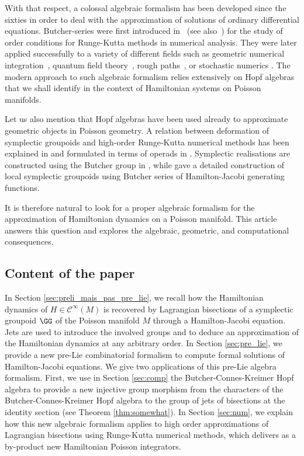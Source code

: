 \documentclass[a4paper,11pt]{article}
\newcommand{\func}[1]{\mathcal{C}^{\infty}(#1)}
\begin{document}
With that respect, a colossal algebraic formalism has been developed since the sixties in order to deal with the approximation of solutions of ordinary differential equations.
Butcher-series were first introduced in~\cite{Butcher72aat,Hairer74otb} (see also~\cite{Hairer06gni,McLachlan17bsa,Butcher21bsa}) for the study of order conditions for Runge-Kutta methods in numerical analysis.
They were later applied successfully to a variety of different fields such as geometric numerical integration~\cite{Iserles00lgm, Hairer06gni}, quantum field theory~\cite{Connes98har}, rough paths~\cite{Gubinelli10ror, Hairer15gvn}, or stochastic numerics \cite{Burrage96hso, Laurent20eab, Laurent21ocf, Busnot25osr}.
The modern approach to such algebraic formalism relies extensively on Hopf algebras \cite{Chartier10aso, Lundervold11hao, Bronasco22cef, Bronasco25hoi} that we shall identify in the context of Hamiltonian systems on Poisson manifolds.

Let us also mention that Hopf algebras have been used already to approximate geometric objects in Poisson geometry. A relation between deformation of symplectic groupoids and high-order Runge-Kutta numerical methods has been explained in \cite{Cattaneo2005} and formulated in terms of operads in \cite{Cattaneo2010}. Symplectic realisations are constructed using the Butcher group in \cite{dherin2016}, while \cite{cabrera2020} gave a detailed construction of local symplectic groupoids using Butcher series of Hamilton-Jacobi generating functions.

It is therefore natural to look for a proper algebraic formalism for the approximation of Hamiltonian dynamics on a Poisson manifold. This article answers this question and explores the algebraic, geometric, and computational consequences.

\subsection{Content of the paper}

In Section \ref{sec:preli_mais_pas_pre_lie}, we recall how the Hamiltonian dynamics of $H \in \func{M}$ is recovered by Lagrangian bisections of a symplectic groupoid $\GG$ of the Poisson manifold $M$ through a Hamilton-Jacobi equation. Jets are used to introduce the involved groups  and to deduce an approximation of the Hamiltonian dynamics at any arbitrary order. In Section \ref{sec:pre_lie}, we provide a new pre-Lie combinatorial formalism to compute formal solutions of Hamilton-Jacobi equations. We give two applications of this pre-Lie algebra formalism. First, we use in Section \ref{sec:comp} the Butcher-Connes-Kreimer Hopf algebra to provide a new injective group morphism from the characters of the Butcher-Connes-Kreimer Hopf algebra to the group of jets of bisections at the identity section (see Theorem \ref{thm:somewhat}). In Section \ref{sec:num}, we explain how this new algebraic formalism applies to high order approximations of Lagrangian bisections using Runge-Kutta numerical methods, which delivers as a by-product new Hamiltonian Poisson integrators.
\end{document}
